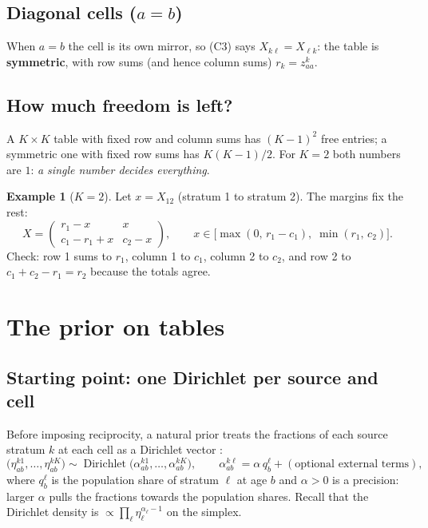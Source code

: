 \documentclass[11pt,a4paper]{article}
\theoremstyle{definition}
\newtheorem{example}{Example}
\theoremstyle{remark}
\DeclareMathOperator{\Dir}{Dirichlet}
\begin{document}
\subsection{Diagonal cells ($a=b$)}

When $a=b$ the cell is its own mirror, so (C3) says $X_{k\ell} = X_{\ell k}$:
the table is \textbf{symmetric}, with row sums (and hence column sums)
$r_k = z^{k}_{aa}$.

\subsection{How much freedom is left?}

A $K\times K$ table with fixed row and column sums has $(K-1)^2$ free
entries; a symmetric one with fixed row sums has $K(K-1)/2$. For $K=2$ both
numbers are $1$: \emph{a single number decides everything}.

\begin{example}[$K=2$]
\label{ex:k2}
Let $x = X_{12}$ (stratum 1 to stratum 2). The margins fix the rest:
\begin{equation}
  X = \begin{pmatrix} r_1 - x & x \\ c_1 - r_1 + x & c_2 - x \end{pmatrix},
  \qquad
  x \in \bigl[\max(0,\, r_1 - c_1),\; \min(r_1,\, c_2)\bigr].
\end{equation}
Check: row 1 sums to $r_1$, column 1 to $c_1$, column 2 to $c_2$, and row 2
to $c_1 + c_2 - r_1 = r_2$ because the totals agree.
\end{example}

\section{The prior on tables}
\label{sec:prior}

\subsection{Starting point: one Dirichlet per source and cell}

Before imposing reciprocity, a natural prior treats the fractions of each
source stratum $k$ at each cell as a Dirichlet vector
\citep[see e.g.][]{ng2011dirichlet}:
\begin{equation}
  \bigl(\eta^{k1}_{ab},\dots,\eta^{kK}_{ab}\bigr) \sim
  \Dir\bigl(\alpha^{k1}_{ab},\dots,\alpha^{kK}_{ab}\bigr),
  \qquad
  \alpha^{k\ell}_{ab} = \alpha\, q^{\ell}_{b} + (\text{optional external terms}),
\end{equation}
where $q^{\ell}_{b}$ is the population share of stratum $\ell$ at age $b$ and
$\alpha>0$ is a precision: larger $\alpha$ pulls the fractions towards the
population shares. Recall that the Dirichlet density is
$\propto \prod_{\ell} \eta_\ell^{\alpha_\ell - 1}$ on the simplex.
\end{document}

